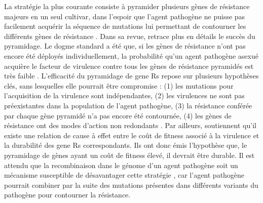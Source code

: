 	La stratégie la plus courante  consiste à pyramider plusieurs gènes de résistance majeurs en un seul cultivar, dans l'espoir que l'agent pathogène ne puisse pas facilement acquérir la séquence de mutations lui permettant de contourner les différents  gènes de résistance \citep{McDonald2002}.  
Dans sa revue, \citet{Mundt2018} retrace plus en détails le succès du pyramidage.
Le dogme standard a été que, si les gènes de résistance n'ont pas encore été déployés individuellement, la probabilité qu'un agent pathogène asexué acquière le facteur de  virulence contre tous les gènes de résistance pyramidés est très faible  \citep{Schafer1985}.
L'efficacité du pyramidage de \glspl{gene R} repose sur plusieurs hypothèses clés, sans lesquelles elle pourrait être compromise  : (1)
les mutations pour l'acquisition de la virulence sont indépendantes, (2) les virulences ne sont pas préexistantes dans la population de l'agent pathogène, (3) la résistance conférée par chaque gène pyramidé n'a pas encore été contournée, (4) les gènes de résistance  ont  des modes d'action non redondants \citep{Bourguet2016}.
 Par ailleurs, \citet{Leach2001} soutiennent  qu'il existe une relation de cause à effet entre le coût de fitness associé à la virulence  et la durabilité des \glspl{gene R} correspondants.
Ils ont donc émis l'hypothèse que, le pyramidage de gènes ayant un coût de fitness élevé, il devrait être durable.
 Il est attendu que la recombinaison dans le génome d'un agent pathogène soit un mécanisme susceptible de désavantager cette stratégie \citep{Burdon2014, Mundt2014, Brown2015}, car l'agent pathogène pourrait combiner par la suite des mutations présentes dans différents variants du pathogène pour contourner la résistance.

